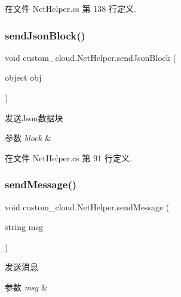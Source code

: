 在文件 Net\+Helper.\+cs 第 138 行定义.

\mbox{\label{classcustom__cloud_1_1_net_helper_afadabaa5d54d445125691d4de3743c6f}} 
\subsubsection{\texorpdfstring{send\+Json\+Block()}{sendJsonBlock()}}
{\footnotesize\ttfamily void custom\+\_\+cloud.\+Net\+Helper.\+send\+Json\+Block (\begin{DoxyParamCaption}\item[{object}]{obj }\end{DoxyParamCaption})}



发送\+Json数据块 


\begin{DoxyParams}{参数}
{\em block} & \\
\hline
\end{DoxyParams}


在文件 Net\+Helper.\+cs 第 91 行定义.

\mbox{\label{classcustom__cloud_1_1_net_helper_a37581b33a0126737316ef7e40e3a1dd5}} 
\subsubsection{\texorpdfstring{send\+Message()}{sendMessage()}}
{\footnotesize\ttfamily void custom\+\_\+cloud.\+Net\+Helper.\+send\+Message (\begin{DoxyParamCaption}\item[{string}]{msg }\end{DoxyParamCaption})}



发送消息 


\begin{DoxyParams}{参数}
{\em msg} & \\
\hline
\end{DoxyParams}


